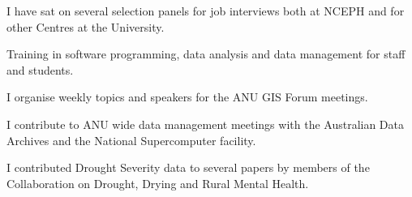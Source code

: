 \documentclass[a4paper,11pt]{article}
\begin{document}
\medskip
\renewcommand{\labelenumi}{\textsc{i}\theenumi.}
\begin{revnumerate}

\item I have sat on several selection panels for job interviews both at NCEPH and for other Centres at the University.

\item Training in software programming, data analysis and data management for staff and students.

\item I organise weekly topics and speakers for the ANU GIS Forum meetings.

\item I contribute to ANU wide data management meetings with the Australian Data Archives and the National Supercomputer facility.

\item I contributed Drought Severity data to several papers by members of the Collaboration on Drought, Drying and Rural Mental Health.
\end{revnumerate}
\end{document}
